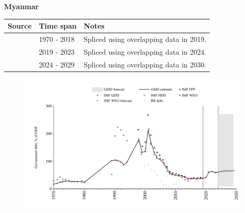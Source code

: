 \documentclass[12pt,a4paper,landscape]{article}
\begin{document}
\begin{adjustbox}{max totalsize={\paperwidth}{\paperheight},center}
\begin{minipage}[t][\textheight][t]{\textwidth}
\vspace*{0.5cm}
{}
\begin{center}
{\Large\bfseries Myanmar}
\end{center}
\vspace{0.5cm}
\begin{table}[H]
\centering
\small
\begin{tabular}{|l|l|l|}
\hline
\textbf{Source} & \textbf{Time span} & \textbf{Notes} \\
\hline
\rowcolor{white}\cite{IMF_GDD}& 1970 - 2018 &Spliced using overlapping data in 2019.\\
\rowcolor{lightgray}\cite{IMF_FPP}& 2019 - 2023 &Spliced using overlapping data in 2024.\\
\rowcolor{white}\cite{IMF_WEO_forecast}& 2024 - 2029 &Spliced using overlapping data in 2030.\\
\hline
\end{tabular}
\end{table}
\begin{figure}[H]
\centering
\includegraphics[width=\textwidth,height=0.6\textheight,keepaspectratio]{graphs/MMR_govdebt_GDP.pdf}
\end{figure}
\end{minipage}
\end{adjustbox}
\end{document}
